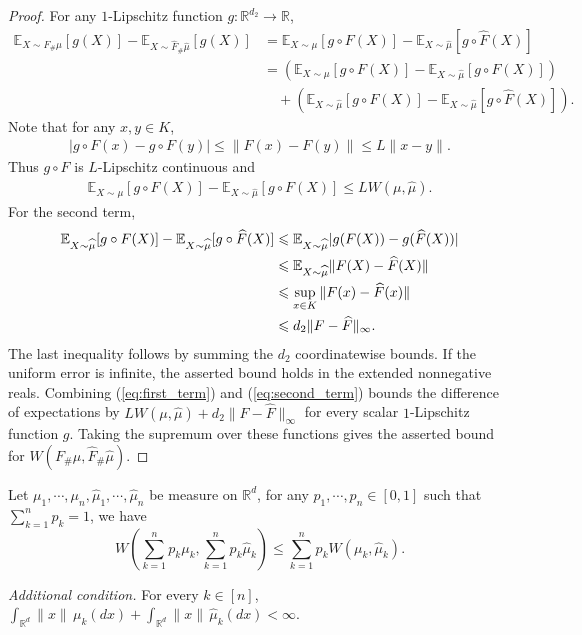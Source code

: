     \begin{proof}
    For any $ 1$-Lipschitz function $ g:\mathbb{R}^{d_{2}}\rightarrow \mathbb{R}$,    
    \begin{align*}
    \mathbb{E}_{X\sim F_{\#} \mu }[ g( X)] -\mathbb{E}_{X\sim \hat{F}_{\#}\hat{\mu }}[ g( X)] & =\mathbb{E}_{X\sim \mu }[ g\circ F( X)] -\mathbb{E}_{X\sim \hat{\mu }}[ g\circ \hat{F}( X)]\\
     & =(\mathbb{E}_{X\sim \mu }[ g\circ F( X)] -\mathbb{E}_{X\sim \hat{\mu }}[ g\circ F( X)]) \\
     &\quad +(\mathbb{E}_{X\sim \hat{\mu }}[ g\circ F( X)] -\mathbb{E}_{X\sim \hat{\mu }}[ g\circ \hat{F}( X)]) .
    \end{align*}
Note that for any $x,y\in K$,
\begin{align*}
|g\circ F(x)-g\circ F(y)|\leqslant\|F(x)-F(y)\|\leqslant L\|x-y\|.
\end{align*}
Thus $g\circ F$ is $L$-Lipschitz continuous and
\begin{align}\label{eq:first_term}
\mathbb E_{X\sim\mu}[g\circ F(X)]-\mathbb E_{X\sim\hat\mu}[g\circ F(X)]\leqslant LW(\mu,\hat\mu).
\end{align}
For the second term,
\begin{align}\label{eq:second_term}
\mathbb E_{X\sim\hat\mu}[g\circ F(X)]-\mathbb E_{X\sim\hat\mu}[g\circ\hat F(X)]
&\leqslant\mathbb E_{X\sim\hat\mu}|g(F(X))-g(\hat F(X))|\notag\\
&\leqslant\mathbb E_{X\sim\hat\mu}\|F(X)-\hat F(X)\|\notag\\
&\leqslant\sup_{x\in K}\|F(x)-\hat F(x)\|\notag\\
&\leqslant d_2\|F-\hat F\|_\infty.
\end{align}
The last inequality follows by summing the $d_2$ coordinatewise bounds. If the uniform error is infinite, the asserted bound holds in the extended nonnegative reals.
    Combining (\ref{eq:first_term}) and (\ref{eq:second_term}) bounds the difference of expectations by $LW(\mu,\hat\mu)+d_2\|F-\hat F\|_\infty$ for every scalar $1$-Lipschitz function $g$. Taking the supremum over these functions gives the asserted bound for $W(F_{\#}\mu,\hat F_{\#}\hat\mu)$.
    \end{proof}


    \begin{lemma}\label{lemma:combin_err}
    Let $ \mu _{1} ,\cdots ,\mu _{n} ,\hat{\mu }_{1} ,\cdots ,\hat{\mu }_{n}$ be measure on $ \mathbb{R}^{d}$, for any $ p_{1} ,\cdots ,p_{n} \in [ 0,1]$ such that $ \sum _{k=1}^{n} p_{k} =1$, we have \begin{equation*}
    W\left(\sum _{k=1}^{n} p_{k} \mu _{k} ,\sum _{k=1}^{n} p_{k}\hat{\mu }_{k}\right) \leqslant \sum _{k=1}^{n} p_{k} W( \mu _{k} ,\hat{\mu }_{k}) .
    \end{equation*}

\emph{Additional condition.} For every $k\in[n]$, $\int_{\mathbb R^d}\|x\|\,\mu_k(dx)+\int_{\mathbb R^d}\|x\|\,\hat\mu_k(dx)<\infty$.
\end{lemma}

